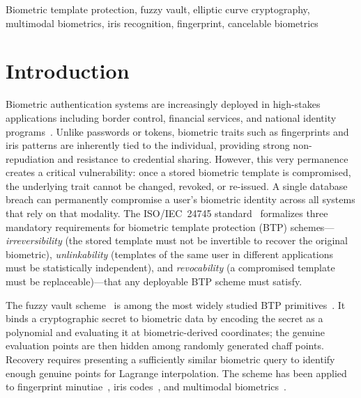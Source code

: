 \documentclass[conference]{IEEEtran}
\begin{document}
\begin{IEEEkeywords}
Biometric template protection, fuzzy vault, elliptic curve cryptography, multimodal biometrics, iris recognition, fingerprint, cancelable biometrics
\end{IEEEkeywords}

\section{Introduction}
\label{sec:introduction}

Biometric authentication systems are increasingly deployed in high-stakes applications including border control, financial services, and national identity programs~\cite{jain2004multibiometrics}. Unlike passwords or tokens, biometric traits such as fingerprints and iris patterns are inherently tied to the individual, providing strong non-repudiation and resistance to credential sharing. However, this very permanence creates a critical vulnerability: once a stored biometric template is compromised, the underlying trait cannot be changed, revoked, or re-issued. A single database breach can permanently compromise a user's biometric identity across all systems that rely on that modality. The ISO/IEC~24745 standard~\cite{iso24745} formalizes three mandatory requirements for biometric template protection (BTP) schemes---\emph{irreversibility} (the stored template must not be invertible to recover the original biometric), \emph{unlinkability} (templates of the same user in different applications must be statistically independent), and \emph{revocability} (a compromised template must be replaceable)---that any deployable BTP scheme must satisfy.

The fuzzy vault scheme~\cite{juels2002fuzzy} is among the most widely studied BTP primitives~\cite{rathgeb2011survey}. It binds a cryptographic secret to biometric data by encoding the secret as a polynomial and evaluating it at biometric-derived coordinates; the genuine evaluation points are then hidden among randomly generated chaff points. Recovery requires presenting a sufficiently similar biometric query to identify enough genuine points for Lagrange interpolation. The scheme has been applied to fingerprint minutiae~\cite{clancy2003secure,nandakumar2007fuzzy,uludag2005fuzzy}, iris codes~\cite{hao2006combining}, and multimodal biometrics~\cite{nandakumar2008multibiometric}.
\end{document}
